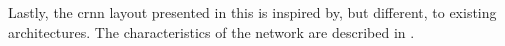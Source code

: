 
Lastly, the \gls{crnn} layout presented in this
\thesisdiss{} is inspired by, but different, to existing
architectures. The characteristics of the network are
described in .
